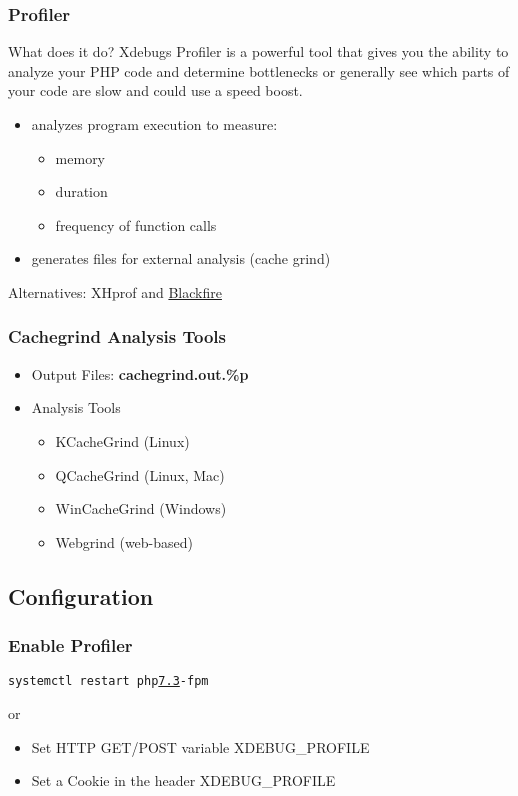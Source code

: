 \begin{frame}\frametitle{Profiler}
    \begin{block}{What does it do?}
    Xdebugs Profiler is a powerful tool that gives you the ability 
    to analyze your PHP code and determine bottlenecks or generally 
    see which parts of your code are slow and could use a speed boost.
    \end{block} \pause
    \begin{itemize}
        \item analyzes program execution to measure:
        \begin{itemize}
            \item memory
            \item duration
            \item frequency of function calls 
        \end{itemize}
        \item generates files for external analysis (cache grind)
    \end{itemize} \pause
    
    Alternatives: XHprof and \underline{Blackfire}
\end{frame}

\begin{frame}\frametitle{Cachegrind Analysis Tools}
    \begin{itemize}
        \item Output Files: {\bf cachegrind.out.\%p} \pause
        \item Analysis Tools \begin{itemize} 
                \item KCacheGrind (Linux)
                \item QCacheGrind (Linux, Mac)
                \item WinCacheGrind (Windows)
                \item Webgrind (web-based) \end{itemize}
    \end{itemize}
\end{frame}

\subsection{Configuration}
\begin{frame}\frametitle{Enable Profiler}
     \pause
    \texttt{systemctl restart php\underline{7.3}-fpm} \pause
    
    or
    \begin{itemize}
        \item Set HTTP GET/POST variable XDEBUG\_PROFILE
        \item Set a Cookie in the header XDEBUG\_PROFILE
    \end{itemize}
\end{frame}
